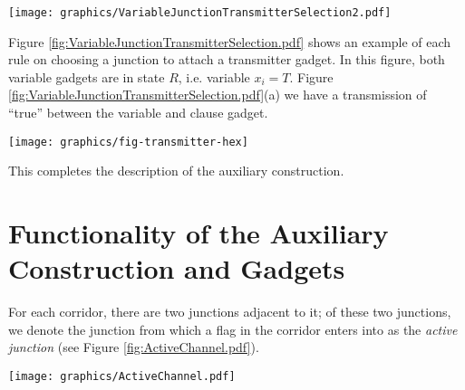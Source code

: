 \documentclass[10pt]{CSUNthesis}
\theoremstyle{plain}%
\theoremstyle{definition}
\theoremstyle{remark}
\begin{document}
\begin{minipage}{\linewidth}
\begin{center}
\texttt{[image: graphics/VariableJunctionTransmitterSelection2.pdf]}
\label{fig:VariableJunctionTransmitterSelection.pdf}
\end{center}
\end{minipage} 

Figure \ref{fig:VariableJunctionTransmitterSelection.pdf} shows an example of each rule on choosing a junction to attach a transmitter gadget.
In this figure, both variable gadgets are in state $R$, i.e. variable $x_i = T$.  
Figure \ref{fig:VariableJunctionTransmitterSelection.pdf}(a) we have a transmission of ``true'' between the variable and clause gadget.

\begin{minipage}{\linewidth}
\begin{center}
	\texttt{[image: graphics/fig-transmitter-hex]}
	\label{fig:transmitter}
\end{center}
\end{minipage} 

This completes the description of the auxiliary construction.

\section{Functionality of the Auxiliary Construction and Gadgets}

For each corridor, there are two junctions adjacent to it; of these two junctions, we denote the junction from which a flag in the corridor enters into as the \textit{active junction} (see Figure \ref{fig:ActiveChannel.pdf}).  

\begin{minipage}{\linewidth}
\begin{center}
\texttt{[image: graphics/ActiveChannel.pdf]}
\label{fig:ActiveChannel.pdf}
\end{center}
\end{minipage}
\end{document}
